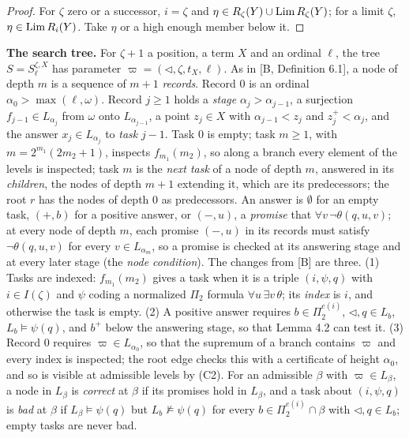 \documentclass[11pt]{article}
\begin{document}
\begin{proof}
For $\zeta$ zero or a successor, $i = \zeta$ and $\eta \in R_\zeta(Y) \cup \mathrm{Lim}\, R_\zeta(Y)$; for a limit $\zeta$,
$\eta \in \mathrm{Lim}\, R_i(Y)$. Take $\eta$ or a high enough member below it.
\end{proof}

\textbf{The search tree.} For $\zeta+1$ a position, a term $X$ and an ordinal $\ell$, the tree $S = S^{\zeta,X}_\ell$
has parameter $\varpi = (\lhd, \zeta, t_X, \ell)$. As in [B, Definition 6.1], a node of depth $m$ is a sequence of $m+1$
\emph{records}. Record $0$ is an ordinal $\alpha_0 > \max(\ell,\omega)$. Record $j \ge 1$ holds a \emph{stage}
$\alpha_j > \alpha_{j-1}$, a surjection $f_{j-1} \in L_{\alpha_j}$ from $\omega$ onto $L_{\alpha_{j-1}}$, a point $z_j
\in X$ with $\alpha_{j-1} < z_j$ and $z_j^+ < \alpha_j$, and the answer $x_j \in L_{\alpha_j}$ to \emph{task} $j-1$. Task $0$ is empty; task
$m \ge 1$, with $m =
2^{m_1}(2m_2+1)$, inspects $f_{m_1}(m_2)$, so along a branch every element of the levels is inspected; task $m$ is the
\emph{next task} of a node of depth $m$, answered in its \emph{children}, the nodes of depth $m+1$ extending it, which
are its predecessors; the root $r$ has the nodes of depth $0$ as predecessors. An answer is $\emptyset$ for an empty
task, $(+,b)$ for a positive answer, or $(-,u)$, a \emph{promise} that $\forall v\, \neg\theta(q,u,v)$; at every node of depth $m$, each promise $(-,u)$ in its records must satisfy $\neg\theta(q,u,v)$ for every $v \in L_{\alpha_m}$, so a promise is checked at its answering stage and at every later stage (the \emph{node condition}). The changes from [B] are three. (1) Tasks are indexed: $f_{m_1}(m_2)$
gives a task when it is a triple $(i, \psi, q)$ with $i \in I(\zeta)$ and $\psi$ coding a normalized $\Pi_2$ formula
$\forall u\, \exists v\, \theta$; its \emph{index} is $i$, and otherwise the task is empty. (2) A positive answer
requires $b \in \Pi_2^{e(i)}$, $\lhd, q \in L_b$, $L_b \models \psi(q)$, and $b^+$ below the answering stage, so that Lemma 4.2
can test it. (3) Record $0$ requires $\varpi \in L_{\alpha_0}$, so that the supremum of a branch contains $\varpi$ and every
index is inspected; the root edge checks this with a certificate of height $\alpha_0$, and so is visible at admissible
levels by (C2). For an admissible $\beta$ with $\varpi \in L_\beta$, a node in $L_\beta$ is
\emph{correct} at $\beta$ if its promises hold in $L_\beta$, and a task about $(i,\psi,q)$ is \emph{bad} at $\beta$ if
$L_\beta \models \psi(q)$ but $L_b \nvDash \psi(q)$ for every $b \in \Pi_2^{e(i)} \cap \beta$ with $\lhd, q \in L_b$; empty tasks
are never bad.
\end{document}

